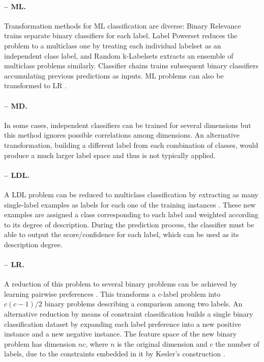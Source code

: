 \paragraph{-- ML.} 
Transformation methods for ML classification \cite{mlmethods} are diverse: Binary Relevance trains separate binary classifiers for each label. Label Powerset reduces the problem to a multiclass one by treating each individual labelset as an independent class label, and Random k-Labelsets \cite{ml-rakel} extracts an ensemble of multiclass problems similarly. Classifier chains \cite{ml-chains} trains subsequent binary classifiers accumulating previous predictions as inputs. ML problems can also be transformed to LR \cite{ml-clr}.

\paragraph{-- MD.} In some cases, independent classifiers can be trained for several dimensions \cite{mdc,mdc-indep} but this method ignores possible correlations among dimensions. An alternative transformation, building a different label from each combination of classes, would produce a much larger label space and thus is not typically applied.

\paragraph{-- LDL.} A LDL problem can be reduced to multiclass classification by extracting as many single-label examples as labels for each one of the training instances \cite{ldl}. These new examples are assigned a class corresponding to each label and weighted according to its degree of description. During the prediction process, the classifier must be able to output the score/confidence for each label, which can be used as its description degree.

\paragraph{-- LR.} A reduction of this problem to several binary problems can be achieved by learning pairwise preferences \cite{lrankpairwise}. This transforms a $c$-label problem into $c(c-1)/2$ binary problems describing a comparison among two labels. An alternative reduction by means of constraint classification \cite{lr-constraint} builds a single binary classification dataset by expanding each label preference into a new positive instance and a new negative instance. The feature space of the new binary problem has dimension $nc$, where $n$ is the original dimension and $c$ the number of labels, due to the constraints embedded in it by Kesler's construction \cite{nilsson}.

